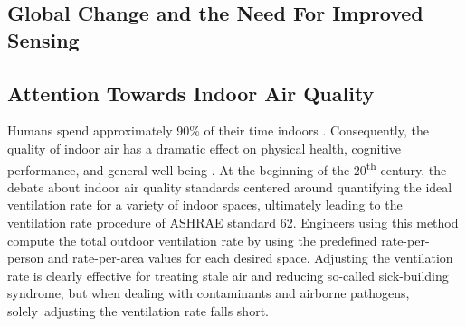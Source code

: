 \subsection{Global Change and the Need For Improved Sensing}

\subsection{Attention Towards Indoor Air Quality}

Humans spend approximately 90\% of their time indoors \cite{finewax_quantification_2021}. Consequently, the quality of indoor air has a dramatic effect on physical health, cognitive performance, and general well-being \cite{Krebs2021AirPC, Gao2021ShorttermAP, Carneiro2021TheEO, Ni2021AssociationsOP, Shehab2019EffectsOS}. At the beginning of the 20\textsuperscript{th} century, the debate about indoor air quality standards centered around quantifying the ideal ventilation rate for a variety of indoor spaces, ultimately leading to the ventilation rate procedure of ASHRAE standard 62. Engineers using this method compute the total outdoor ventilation rate by using the predefined rate-per-person and rate-per-area values for each desired space. Adjusting the ventilation rate is clearly effective for treating stale air and reducing so-called sick-building syndrome, but when dealing with contaminants and airborne pathogens, solely adjusting the ventilation rate falls short.


